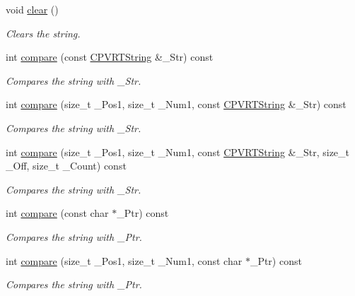 \begin{DoxyCompactItemize}
void \hyperlink{class_c_p_v_r_t_string_a68ced67b1e2866a680be2ce143253772}{clear} ()
\begin{DoxyCompactList}\small\item\em Clears the string. \end{DoxyCompactList}\item 
int \hyperlink{class_c_p_v_r_t_string_aac2f2e6f45ca19cea06c3988e11d6b15}{compare} (const \hyperlink{class_c_p_v_r_t_string}{C\+P\+V\+R\+T\+String} \&\+\_\+\+Str) const 
\begin{DoxyCompactList}\small\item\em Compares the string with \+\_\+\+Str. \end{DoxyCompactList}\item 
int \hyperlink{class_c_p_v_r_t_string_a18c9c740d80ca610aabf2f9b5f1092de}{compare} (size\+\_\+t \+\_\+\+Pos1, size\+\_\+t \+\_\+\+Num1, const \hyperlink{class_c_p_v_r_t_string}{C\+P\+V\+R\+T\+String} \&\+\_\+\+Str) const 
\begin{DoxyCompactList}\small\item\em Compares the string with \+\_\+\+Str. \end{DoxyCompactList}\item 
int \hyperlink{class_c_p_v_r_t_string_a20bad10e494a9227e631cb61bf83a1f9}{compare} (size\+\_\+t \+\_\+\+Pos1, size\+\_\+t \+\_\+\+Num1, const \hyperlink{class_c_p_v_r_t_string}{C\+P\+V\+R\+T\+String} \&\+\_\+\+Str, size\+\_\+t \+\_\+\+Off, size\+\_\+t \+\_\+\+Count) const 
\begin{DoxyCompactList}\small\item\em Compares the string with \+\_\+\+Str. \end{DoxyCompactList}\item 
int \hyperlink{class_c_p_v_r_t_string_adcca074e685aa4600c6eb5198a82c259}{compare} (const char $\ast$\+\_\+\+Ptr) const 
\begin{DoxyCompactList}\small\item\em Compares the string with \+\_\+\+Ptr. \end{DoxyCompactList}\item 
int \hyperlink{class_c_p_v_r_t_string_a47b3483deccd5aec82bcb637983eb77c}{compare} (size\+\_\+t \+\_\+\+Pos1, size\+\_\+t \+\_\+\+Num1, const char $\ast$\+\_\+\+Ptr) const 
\begin{DoxyCompactList}\small\item\em Compares the string with \+\_\+\+Ptr. \end{DoxyCompactList}\item 

\end{DoxyCompactItemize}
